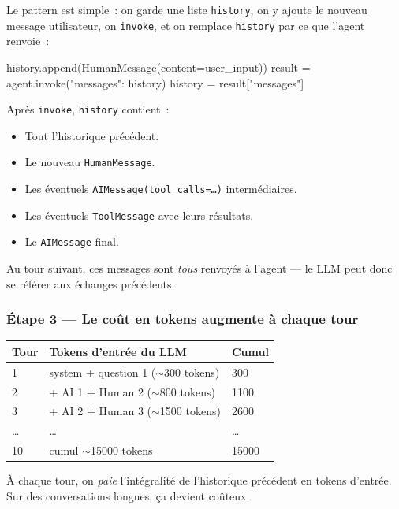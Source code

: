 \documentclass[11pt,a4paper]{article}
\begin{document}
Le pattern est simple~: on garde une liste \texttt{history}, on y ajoute
le nouveau message utilisateur, on \texttt{invoke}, et on remplace
\texttt{history} par ce que l'agent renvoie~:

\begin{pythoncode}
history.append(HumanMessage(content=user_input))
result  = agent.invoke({"messages": history})
history = result["messages"]
\end{pythoncode}

Après \texttt{invoke}, \texttt{history} contient~:
\begin{itemize}[leftmargin=*]
  \item Tout l'historique précédent.
  \item Le nouveau \texttt{HumanMessage}.
  \item Les éventuels \texttt{AIMessage(tool\_calls=\dots)} intermédiaires.
  \item Les éventuels \texttt{ToolMessage} avec leurs résultats.
  \item Le \texttt{AIMessage} final.
\end{itemize}

Au tour suivant, ces messages sont \emph{tous} renvoyés à l'agent — le
LLM peut donc se référer aux échanges précédents.

\subsubsection*{Étape 3 — Le coût en tokens augmente à chaque tour}

\begin{center}
\begin{tabular}{lll}
\toprule
\textbf{Tour} & \textbf{Tokens d'entrée du LLM} & \textbf{Cumul} \\
\midrule
1   & system + question 1 ($\sim$300 tokens) & 300 \\
2   & + AI 1 + Human 2 ($\sim$800 tokens)    & 1100 \\
3   & + AI 2 + Human 3 ($\sim$1500 tokens)   & 2600 \\
\dots & \dots & \dots \\
10  & cumul $\sim$15000 tokens               & 15000 \\
\bottomrule
\end{tabular}
\end{center}

À chaque tour, on \emph{paie} l'intégralité de l'historique précédent en
tokens d'entrée. Sur des conversations longues, ça devient coûteux.
\end{document}
